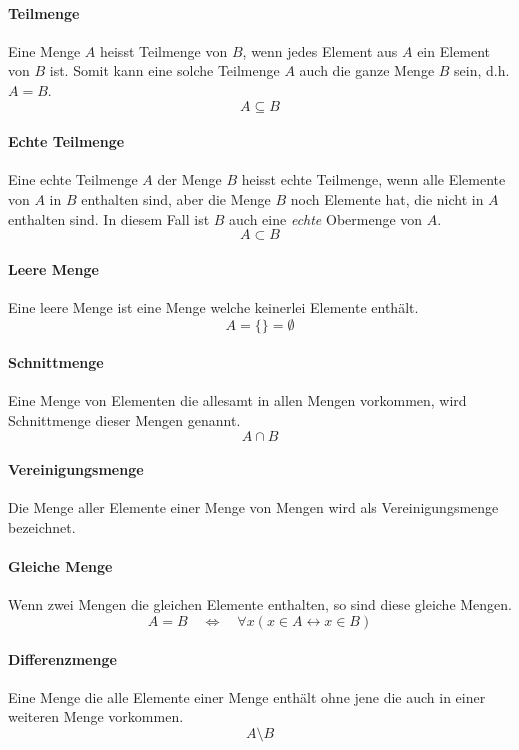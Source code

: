 \paragraph{Teilmenge} 
Eine Menge $A$ heisst Teilmenge von $B$, wenn jedes Element aus 
$A$ ein Element von $B$ ist. Somit kann eine solche Teilmenge $A$
auch die ganze Menge $B$ sein, d.h. $A=B$.
\[ 
	A \subseteq B
\]
\paragraph{Echte Teilmenge}
Eine echte Teilmenge $A$ der Menge $B$ heisst echte Teilmenge, wenn
alle Elemente von $A$ in $B$ enthalten sind, aber die Menge $B$ noch
Elemente hat, die nicht in $A$ enthalten sind. In diesem Fall ist $B$ 
auch eine \emph{echte} Obermenge von $A$.
\[
	A \subset B
\]

\paragraph{Leere Menge} Eine leere Menge ist eine Menge welche keinerlei
Elemente enthält.
\[  
	A = \{\} = \emptyset
\]

\paragraph{Schnittmenge} Eine Menge von Elementen die allesamt in
allen Mengen vorkommen, wird Schnittmenge dieser Mengen genannt.
\[ 
	A \cap B
\]

\paragraph{Vereinigungsmenge} Die Menge aller Elemente einer Menge
von Mengen wird als Vereinigungsmenge bezeichnet.

\paragraph{Gleiche Menge} Wenn zwei Mengen die gleichen Elemente
enthalten, so sind diese gleiche Mengen.
\[  
	A = B 
	\quad \Leftrightarrow \quad 
	\forall x (x \in A \leftrightarrow x \in B)
\]

\paragraph{Differenzmenge}
Eine Menge die alle Elemente einer Menge enthält ohne jene die auch
in einer weiteren Menge vorkommen.
\[  
	A \setminus  B
\]

